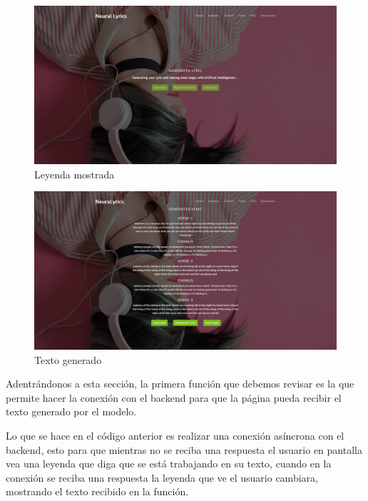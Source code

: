 \documentclass[12pt, a4paper, titlepage]{article}
\begin{document}
	\begin{figure}[H]
		\includegraphics[width=13.5cm]{./Imagenes/AplicacionWeb/pgenerating.png}
		\centering 
		\caption{Leyenda mostrada}
	\end{figure}
	\begin{figure}[H]
		\includegraphics[width=13.5cm]{./Imagenes/AplicacionWeb/Generated.png}
		\centering 
		\caption{Texto generado}
	\end{figure}
	Adentrándonos a esta sección, la primera función que debemos revisar es la que permite hacer la conexión con el backend para que la página pueda recibir el texto generado por el modelo.
	\newpage
	\begin{center}
		
	\end{center}
	Lo que se hace en el código anterior es realizar una conexión asíncrona con el backend, esto para que mientras no se reciba una respuesta el usuario en pantalla vea una leyenda que diga que se está trabajando en su texto, cuando en la conexión se reciba una respuesta la leyenda que ve el usuario cambiara, mostrando el texto recibido en la función.
	\begin{center}
		
	\end{center}
\end{document}
